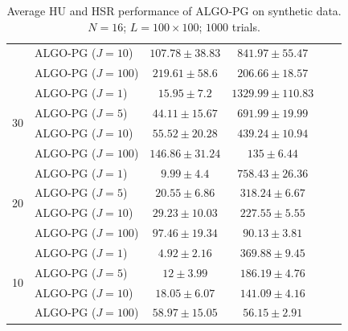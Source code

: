 \begin{table}[h]
\begin{adjustbox}{max width=\textwidth}
\begin{tabular}{|c|l|c|c|c|c|}
                    & ALGO-PG ($J=10$)           & $107.78   \pm 38.83$  & $841.97   \pm 55.47$ \tabularnewline
                    & ALGO-PG ($J=100$)          & $219.61   \pm 58.6$   & $206.66   \pm 18.57$ \tabularnewline \cline{1-4}
\multirow{4}{*}{30} & ALGO-PG ($J=1$)            & $15.95    \pm 7.2$    & $1329.99  \pm 110.83$ \tabularnewline
                    & ALGO-PG ($J=5$)            & $44.11    \pm 15.67$  & $691.99   \pm 19.99$  \tabularnewline
                    & ALGO-PG ($J=10$)           & $55.52    \pm 20.28$  & $439.24   \pm 10.94$  \tabularnewline
                    & ALGO-PG ($J=100$)          & $146.86   \pm 31.24$  & $135      \pm 6.44$   \tabularnewline \cline{1-4}
\multirow{4}{*}{20} & ALGO-PG ($J=1$)            & $9.99     \pm 4.4$    & $758.43   \pm 26.36$ \tabularnewline
                    & ALGO-PG ($J=5$)            & $20.55    \pm 6.86$   & $318.24   \pm 6.67$  \tabularnewline
                    & ALGO-PG ($J=10$)           & $29.23    \pm 10.03$  & $227.55   \pm 5.55$  \tabularnewline
                    & ALGO-PG ($J=100$)          & $97.46    \pm 19.34$  & $90.13    \pm 3.81$  \tabularnewline \cline{1-4}
\multirow{4}{*}{10} & ALGO-PG ($J=1$)            & $4.92     \pm 2.16$   & $369.88   \pm 9.45$ \tabularnewline
                    & ALGO-PG ($J=5$)            & $12       \pm 3.99$   & $186.19   \pm 4.76$ \tabularnewline
                    & ALGO-PG ($J=10$)           & $18.05    \pm 6.07$   & $141.09   \pm 4.16$ \tabularnewline
                    & ALGO-PG ($J=100$)          & $58.97    \pm 15.05$  & $56.15    \pm 2.91$ \tabularnewline \cline{1-4}
\end{tabular}                                                                                                                                                  
\end{adjustbox}                                                                                                                                                
\caption{Average HU and HSR performance of ALGO-PG on synthetic data.                                                                                        
         $N = 16$; $L = 100 \times 100$; $1000$ trials.}                                                                                            
\label{table:results_full_PG_MO16}
\end{table}


